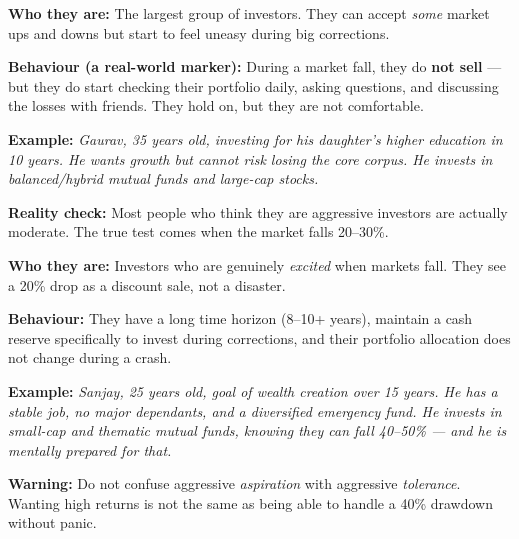\documentclass[12pt,a4paper]{article}
\newcommand{\faBalanceScale}{\ding{202}}
\newcommand{\faRocket}{\ding{225}}
\begin{document}
\vspace{3mm}

\begin{tcolorbox}[base, colback=Moderate!8, colframe=Moderate,
  title={\faBalanceScale\;\textbf{Moderate (Medium Tolerance)}},
  fonttitle=\bfseries\color{white}, colbacktitle=Moderate]

\textbf{Who they are:} The largest group of investors. They can accept \textit{some} market ups and downs but start to feel uneasy during big corrections.

\medskip
\textbf{Behaviour (a real-world marker):} During a market fall, they do \textbf{not sell} --- but they do start checking their portfolio daily, asking questions, and discussing the losses with friends. They hold on, but they are not comfortable.

\medskip
\textbf{Example:} \textit{Gaurav, 35 years old, investing for his daughter's higher education in 10 years. He wants growth but cannot risk losing the core corpus. He invests in balanced/hybrid mutual funds and large-cap stocks.}

\medskip
\textbf{Reality check:} Most people who think they are aggressive investors are actually moderate. The true test comes when the market falls 20--30\%.
\end{tcolorbox}

\vspace{3mm}

\begin{tcolorbox}[base, colback=Aggressive!8, colframe=Aggressive,
  title={\faRocket\;\textbf{Aggressive (High Tolerance)}},
  fonttitle=\bfseries\color{white}, colbacktitle=Aggressive]

\textbf{Who they are:} Investors who are genuinely \textit{excited} when markets fall. They see a 20\% drop as a discount sale, not a disaster.

\medskip
\textbf{Behaviour:} They have a long time horizon (8--10+ years), maintain a cash reserve specifically to invest during corrections, and their portfolio allocation does not change during a crash.

\medskip
\textbf{Example:} \textit{Sanjay, 25 years old, goal of wealth creation over 15 years. He has a stable job, no major dependants, and a diversified emergency fund. He invests in small-cap and thematic mutual funds, knowing they can fall 40--50\% --- and he is mentally prepared for that.}

\medskip
\textbf{Warning:} Do not confuse aggressive \textit{aspiration} with aggressive \textit{tolerance}. Wanting high returns is not the same as being able to handle a 40\% drawdown without panic.
\end{tcolorbox}
\end{document}
